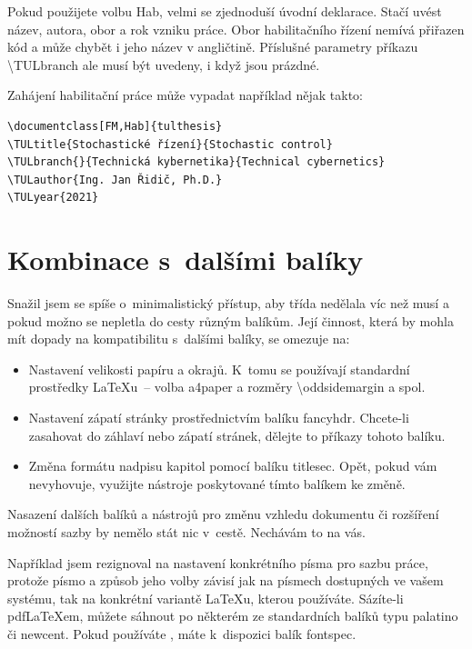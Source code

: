 \documentclass[FM,BP]{tulthesis}
\makeatletter
\newcommand{\argument}[1]{{\ttfamily\color{\tulcolor}#1}}
\newcommand{\argumentindex}[1]{\argument{#1}\index{#1}}
\newcommand{\prikazneindex}[1]{\argument{\textbackslash #1}}
\newcommand{\prikaz}[1]{\prikazneindex{#1}\index{#1@\textbackslash #1}}
\newenvironment{myquote}{\begin{list}{}{\setlength\leftmargin\parindent}\item[]}{\end{list}}
\newenvironment{listing}{\begin{myquote}\color{\tulcolor}}{\end{myquote}}
\makeatother
\begin{document}
Pokud použijete volbu \argumentindex{Hab}, velmi se zjednoduší úvodní
deklarace. Stačí uvést název, autora, obor a rok vzniku práce. Obor
habilitačního řízení nemívá přiřazen kód a může chybět i jeho název v
angličtině. Příslušné parametry příkazu \prikaz{TULbranch} ale musí být
uvedeny, i když jsou prázdné.

Zahájení habilitační práce může vypadat například nějak takto:

\begin{listing}
\begin{verbatim}
\documentclass[FM,Hab]{tulthesis}
\TULtitle{Stochastické řízení}{Stochastic control}
\TULbranch{}{Technická kybernetika}{Technical cybernetics}
\TULauthor{Ing. Jan Řidič, Ph.D.}
\TULyear{2021}
\end{verbatim}
\end{listing}


\section{Kombinace s~dalšími balíky}

Snažil jsem se spíše o~minimalistický přístup, aby třída nedělala víc než musí
a pokud možno se nepletla do cesty různým balíkům. Její činnost, která by
mohla mít dopady na kompatibilitu s~dalšími balíky, se omezuje na:

\begin{itemize}
\item Nastavení velikosti papíru a okrajů. K~tomu se používají standardní
prostředky \LaTeX u~-- volba \argument{a4paper} a rozměry
\prikazneindex{oddsidemargin} a spol.

\item Nastavení zápatí stránky prostřednictvím balíku \argument{fancyhdr}.
Chcete-li zasahovat do záhlaví nebo zápatí stránek, dělejte to příkazy tohoto
balíku.

\item Změna formátu nadpisu kapitol pomocí balíku \argument{titlesec}. Opět,
pokud vám nevyhovuje, využijte nástroje poskytované tímto balíkem ke změně.

\end{itemize}

Nasazení dalších balíků a nástrojů pro změnu vzhledu dokumentu či rozšíření
možností sazby by nemělo stát nic v~cestě. Nechávám to na vás.

Například jsem rezignoval na nastavení konkrétního písma pro sazbu práce,
protože písmo a způsob jeho volby závisí jak na písmech dostupných ve vašem
systému, tak na konkrétní variantě \LaTeX u, kterou používáte. Sázíte-li
pdf\-\LaTeX\-em, můžete sáhnout po některém ze standardních balíků typu
\argument{palatino} či \argument{newcent}. Pokud používáte \XeLaTeX, máte
k~dispozici balík \argument{fontspec}.
\end{document}
